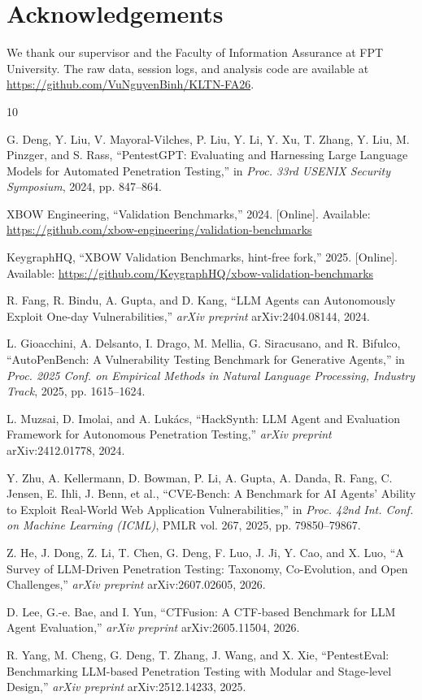 \documentclass[11pt]{article}
\begin{document}
\section*{Acknowledgements}
We thank our supervisor and the Faculty of Information Assurance at FPT University. The raw data, session logs, and analysis code are available at \url{https://github.com/VuNguyenBinh/KLTN-FA26}.

\begin{thebibliography}{10}

G. Deng, Y. Liu, V. Mayoral-Vilches, P. Liu, Y. Li, Y. Xu, T. Zhang, Y. Liu, M. Pinzger, and S. Rass, ``PentestGPT: Evaluating and Harnessing Large Language Models for Automated Penetration Testing,'' in \emph{Proc. 33rd USENIX Security Symposium}, 2024, pp. 847--864.

XBOW Engineering, ``Validation Benchmarks,'' 2024. [Online]. Available: \url{https://github.com/xbow-engineering/validation-benchmarks}

KeygraphHQ, ``XBOW Validation Benchmarks, hint-free fork,'' 2025. [Online]. Available: \url{https://github.com/KeygraphHQ/xbow-validation-benchmarks}

R. Fang, R. Bindu, A. Gupta, and D. Kang, ``LLM Agents can Autonomously Exploit One-day Vulnerabilities,'' \emph{arXiv preprint} arXiv:2404.08144, 2024.

L. Gioacchini, A. Delsanto, I. Drago, M. Mellia, G. Siracusano, and R. Bifulco, ``AutoPenBench: A Vulnerability Testing Benchmark for Generative Agents,'' in \emph{Proc. 2025 Conf. on Empirical Methods in Natural Language Processing, Industry Track}, 2025, pp. 1615--1624.

L. Muzsai, D. Imolai, and A. Luk\'acs, ``HackSynth: LLM Agent and Evaluation Framework for Autonomous Penetration Testing,'' \emph{arXiv preprint} arXiv:2412.01778, 2024.

Y. Zhu, A. Kellermann, D. Bowman, P. Li, A. Gupta, A. Danda, R. Fang, C. Jensen, E. Ihli, J. Benn, et al., ``CVE-Bench: A Benchmark for AI Agents' Ability to Exploit Real-World Web Application Vulnerabilities,'' in \emph{Proc. 42nd Int. Conf. on Machine Learning (ICML)}, PMLR vol. 267, 2025, pp. 79850--79867.

Z. He, J. Dong, Z. Li, T. Chen, G. Deng, F. Luo, J. Ji, Y. Cao, and X. Luo, ``A Survey of LLM-Driven Penetration Testing: Taxonomy, Co-Evolution, and Open Challenges,'' \emph{arXiv preprint} arXiv:2607.02605, 2026.

D. Lee, G.-e. Bae, and I. Yun, ``CTFusion: A CTF-based Benchmark for LLM Agent Evaluation,'' \emph{arXiv preprint} arXiv:2605.11504, 2026.

R. Yang, M. Cheng, G. Deng, T. Zhang, J. Wang, and X. Xie, ``PentestEval: Benchmarking LLM-based Penetration Testing with Modular and Stage-level Design,'' \emph{arXiv preprint} arXiv:2512.14233, 2025.

\end{thebibliography}
\end{document}
